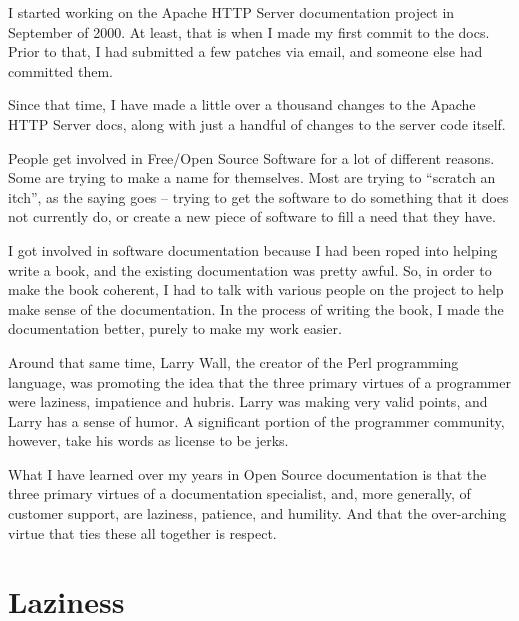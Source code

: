 

\noindent{}I started working on the Apache HTTP Server documentation project in September
of 2000. At least, that is when I made my first commit to the docs. Prior to
that, I had submitted a few patches via email, and someone else had committed
them.

Since that time, I have made a little over a thousand changes to the Apache HTTP
Server docs, along with just a handful of changes to the server code itself.

People get involved in Free/Open Source Software for a lot of different reasons.
Some are trying to make a name for themselves. Most are trying to ``scratch an
itch'', as the saying goes -- trying to get the software to do something that it
does not currently do, or create a new piece of software to fill a need that
they have.

I got involved in software documentation because I had been roped into helping
write a book, and the existing documentation was pretty awful. So, in order to
make the book coherent, I had to talk with various people on the project to help
make sense of the documentation. In the process of writing the book, I made the
documentation better, purely to make my work easier.

Around that same time, Larry Wall, the creator of the Perl programming language,
was promoting the idea that the three primary virtues of a programmer were
laziness, impatience and hubris. Larry was making very valid points, and Larry
has a sense of humor. A significant portion of the programmer community,
however, take his words as license to be jerks.

What I have learned over my years in Open Source documentation is that the three
primary virtues of a documentation specialist, and, more generally, of customer
support, are laziness, patience, and humility. And that the over-arching virtue
that ties these all together is respect.

\section*{Laziness}

